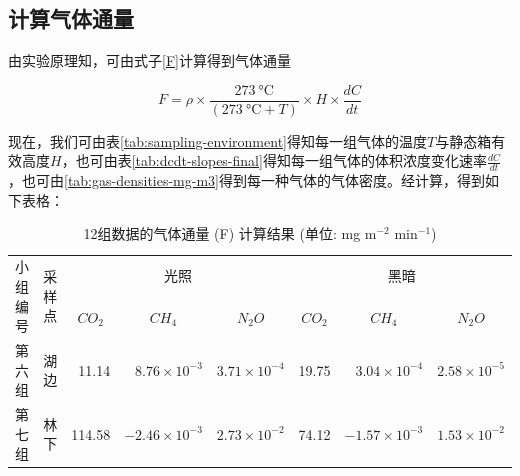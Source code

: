 \documentclass[10.5pt]{config}
\begin{document}
\subsection{计算气体通量}

由实验原理知，可由式子\ref{F}计算得到气体通量

    \begin{equation*}
        F = \rho \times \frac{\SI{273}{\celsius}}{(\SI{273}{\celsius} + T)} \times H \times \frac{dC}{dt}
        \label{F}
    \end{equation*}

现在，我们可由表\ref{tab:sampling-environment}得知每一组气体的温度$T$与静态箱有效高度$H$，也可由表\ref{tab:dcdt-slopes-final}得知每一组气体的体积浓度变化速率$\frac{dC}{dt}$，也可由\ref{tab:gas-densities-mg-m3}得到每一种气体的气体密度。经计算，得到如下表格：

\begin{table}[htbp]
    \centering
    \caption{12组数据的气体通量 (F) 计算结果 (单位: mg m$^{-2}$ min$^{-1}$)}
    \label{tab:flux-results}
    
    \begin{tabular}{llrrrrrr}
        \toprule
        
        \multirow{2}{*}{小组编号} & \multirow{2}{*}{采样点} & \multicolumn{3}{c}{光照} & \multicolumn{3}{c}{黑暗} \\
        \cmidrule(lr){3-5} \cmidrule(lr){6-8} %
        
        & & \multicolumn{1}{c}{$CO_2$} & \multicolumn{1}{c}{$CH_4$} & \multicolumn{1}{c}{$N_2O$} & \multicolumn{1}{c}{$CO_2$} & \multicolumn{1}{c}{$CH_4$} & \multicolumn{1}{c}{$N_2O$} \\
        
        \midrule
        
        第六组 & 湖边 & 
        11.14 & $8.76 \times 10^{-3}$ & $3.71 \times 10^{-4}$ & 
        19.75 & $3.04 \times 10^{-4}$ & $2.58 \times 10^{-5}$ \\
        
        第七组 & 林下 & 
        114.58 & $-2.46 \times 10^{-3}$ & $2.73 \times 10^{-2}$ & 
        74.12 & $-1.57 \times 10^{-3}$ & $1.53 \times 10^{-2}$ \\
        
        \bottomrule
    \end{tabular}
\end{table}
\end{document}
